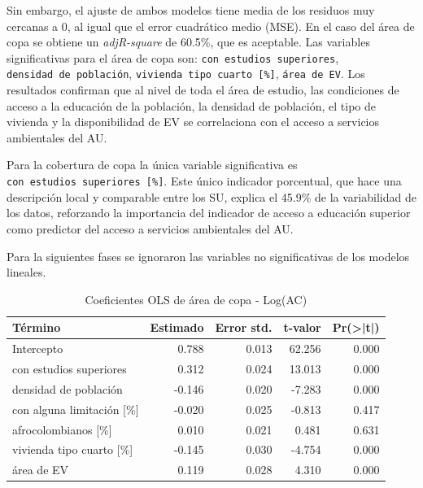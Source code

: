 \documentclass[12pt,a4paper,oneside, openany]{book}
\theoremstyle{definition}
\theoremstyle{definition}
\theoremstyle{definition}
\theoremstyle{remark}
\begin{document}
Sin embargo, el ajuste de ambos modelos tiene media de los residuos muy
cercanas a 0, al igual que el error cuadrático medio (MSE). En el caso
del área de copa se obtiene un \emph{adjR-square} de 60.5\%, que es
aceptable. Las variables significativas para el área de copa son:
\texttt{con\ estudios\ superiores}, \texttt{densidad\ de\ población},
\texttt{vivienda\ tipo\ cuarto\ {[}\%{]}}, \texttt{área\ de\ EV}. Los
resultados confirman que al nivel de toda el área de estudio, las
condiciones de acceso a la educación de la población, la densidad de
población, el tipo de vivienda y la disponibilidad de EV se correlaciona
con el acceso a servicios ambientales del AU.

Para la cobertura de copa la única variable significativa es
\texttt{con\ estudios\ superiores\ {[}\%{]}}. Este único indicador
porcentual, que hace una descripción local y comparable entre los SU,
explica el 45.9\% de la variabilidad de los datos, reforzando la
importancia del indicador de acceso a educación superior como predictor
del acceso a servicios ambientales del AU.

Para la siguientes fases se ignoraron las variables no significativas de
los modelos lineales.

\begin{table}[H]

\caption{\label{tab:coef-lm-copa}Coeficientes OLS de área de copa - Log(AC)}
\centering
\begin{tabular}{lrrrr}
\toprule
Término & Estimado & Error std. & t-valor & Pr(>|t|)\\
\midrule
Intercepto & 0.788 & 0.013 & 62.256 & 0.000\\
con estudios superiores & 0.312 & 0.024 & 13.013 & 0.000\\
densidad de población & -0.146 & 0.020 & -7.283 & 0.000\\
con alguna limitación [\%] & -0.020 & 0.025 & -0.813 & 0.417\\
afrocolombianos [\%] & 0.010 & 0.021 & 0.481 & 0.631\\
\addlinespace
vivienda tipo cuarto [\%] & -0.145 & 0.030 & -4.754 & 0.000\\
área de EV & 0.119 & 0.028 & 4.310 & 0.000\\
\bottomrule
\end{tabular}
\end{table}
\end{document}
